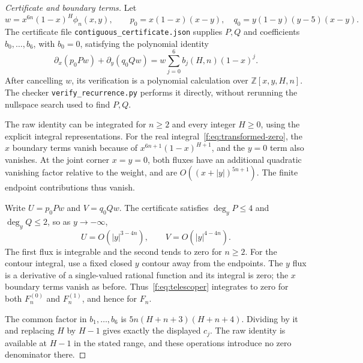\documentclass[11pt]{amsart}
\newcommand{\Z}{\mathbb Z}
\theoremstyle{plain}
\theoremstyle{remark}\newtheorem{remark}[theorem]{Remark}
\numberwithin{equation}{section}
\begin{document}
\begin{proof}[Certificate and boundary terms]
Let
\[
 w=x^{6n}(1-x)^H\phi_n(x,y),\qquad
 p_0=x(1-x)(x-y),\quad q_0=y(1-y)(y-5)(x-y).
\]
The certificate file \texttt{contiguous\_certificate.json} supplies $P,Q$ and coefficients $b_0,\ldots,b_6$, with $b_0=0$, satisfying the polynomial identity
\begin{equation}\label{f:eq:telescoper}
 \partial_x(p_0Pw)+\partial_y(q_0Qw)
 =w\sum_{j=0}^6 b_j(H,n)(1-x)^j.
\end{equation}
After cancelling $w$, its verification is a polynomial calculation over $\Z[x,y,H,n]$. The checker \texttt{verify\_recurrence.py} performs it directly, without rerunning the nullspace search used to find $P,Q$.

The raw identity can be integrated for $n\ge2$ and every integer
$H\ge0$, using the explicit integral representations. For the real
integral~\eqref{f:eq:transformed-zero}, the $x$ boundary terms vanish
because of $x^{6n+1}(1-x)^{H+1}$, and the $y=0$ term also vanishes.
At the joint corner $x=y=0$, both fluxes have an additional quadratic
vanishing factor relative to the weight, and are
$O((x+|y|)^{5n+1})$. The finite endpoint contributions thus vanish.

Write $U=p_0Pw$ and $V=q_0Qw$. The certificate satisfies
$\deg_yP\le4$ and $\deg_yQ\le2$, so as $y\to-\infty$,
\[
 U=O(|y|^{3-4n}),\qquad V=O(|y|^{4-4n}).
\]
The first flux is integrable and the second tends to zero for $n\ge2$.
For the contour integral, use a fixed closed $y$ contour away from
the endpoints. The $y$ flux is a derivative of a single-valued rational
function and its integral is zero; the $x$ boundary terms vanish as
before. Thus~\eqref{f:eq:telescoper} integrates to zero for both
$F_n^{(0)}$ and $F_n^{(1)}$, and hence for $F_n$.

The common factor in $b_1,\ldots,b_6$ is $5n(H+n+3)(H+n+4)$. Dividing by it and replacing $H$ by $H-1$ gives exactly the displayed $c_j$. The raw identity is available at $H-1$ in the stated range, and these operations introduce no zero denominator there.
\end{proof}
\end{document}
